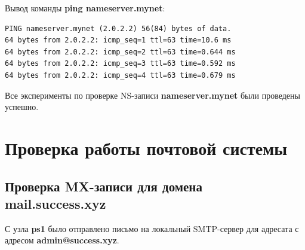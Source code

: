 \documentclass[a4paper,12pt]{article}
\begin{document}
Вывод команды \textbf{ping nameserver.mynet}:
\begin{verbatim}
PING nameserver.mynet (2.0.2.2) 56(84) bytes of data.
64 bytes from 2.0.2.2: icmp_seq=1 ttl=63 time=10.6 ms
64 bytes from 2.0.2.2: icmp_seq=2 ttl=63 time=0.644 ms
64 bytes from 2.0.2.2: icmp_seq=3 ttl=63 time=0.592 ms
64 bytes from 2.0.2.2: icmp_seq=4 ttl=63 time=0.679 ms
\end{verbatim}

Все эксперименты по проверке NS-записи \textbf{nameserver.mynet} были проведены успешно.

\section{Проверка работы почтовой системы}

\subsection{Проверка MX-записи для домена \textbf{mail.success.xyz}}

С узла \textbf{ps1} было отправлено письмо на локальный SMTP-сервер для адресата с адресом \textbf{admin@success.xyz}.
\end{document}
